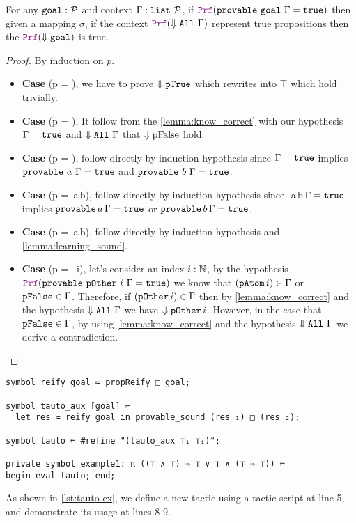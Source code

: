 \begin{theorem}
For any $\texttt{\upshape{goal}}: \mathcal{P}$ and context $\Gamma: \texttt{list}~\mathcal{P}$, if $\prf (\kw{provable}~\kw{goal}~\hyps = \true)$
then given a mapping $\sigma$, if the context $\prf (\deno{\kw{All}~\hyps})$ represent true propositions then the $\prf (\deno{\kw{goal}})$ is true.
\begin{proof} By induction on $p$.
\begin{itemize}
\item[] \textbf{Case} (p = ), we have to prove $\Downarrow \texttt{\upshape{pTrue}}$ which rewrites into $\top$ which hold trivially.
\item[] \textbf{Case} (p = ), It follow from the \cref{lemma:know_correct} with our hypothesis   $\Gamma = \texttt{\upshape{true}}$ and $\Downarrow \texttt{\upshape{All}}~\Gamma$ that $\Downarrow \text{pFalse}$ hold.
\item[] \textbf{Case} (p = ), follow directly by induction hypothesis since   $\Gamma = \texttt{\upshape{true}}$ implies $\texttt{\upshape{provable}}~a~\Gamma = \texttt{\upshape{true}}$ and $\texttt{\upshape{provable}}~b~\Gamma = \texttt{\upshape{true}}$.
\item[] \textbf{Case} (p = \,a\,b), follow directly by induction hypothesis since \,\,a\,b\,$\Gamma = \texttt{\upshape{true}}$ implies $\texttt{\upshape{provable}}\,a\,\Gamma = \texttt{\upshape{true}}$ or $\texttt{\upshape{provable}}\,b\,\Gamma = \texttt{\upshape{true}}$.
\item[] \textbf{Case} (p = \,a\,b), follow directly by induction hypothesis and \cref{lemma:learning_sound}.
\item[] \textbf{Case} (p = ~i), let's consider an index $i: \mathbb{N}$, by the hypothesis $\prf (\kw{provable}~\kw{pOther}~i~\hyps = \true)$  we know that $(\texttt{\upshape{pAtom}}\,i) \in \Gamma$ or $\texttt{\upshape{pFalse}} \in \Gamma$. Therefore,
if $(\texttt{\upshape{pOther}}\,i) \in \Gamma$ then by \cref{lemma:know_correct} and the hypothesis $\Downarrow \texttt{\upshape{All}}~\Gamma$ we have $\Downarrow \texttt{\upshape{pOther}}\,i$. However,
in the case that $\texttt{\upshape{pFalse}} \in \Gamma$, by using \cref{lemma:know_correct} and the hypothesis $\Downarrow \texttt{\upshape{All}}~\Gamma$ we derive a contradiction.
\end{itemize}
\end{proof}
\end{theorem}

\begin{lstlisting}[language=Lambdapi, caption={Usage of Tauto}, label={lst:tauto-ex}]
symbol reify goal ≔ propReify □ goal;

symbol tauto_aux [goal] ≔
  let res ≔ reify goal in provable_sound (res ₁) □ (res ₂);

symbol tauto ≔ #refine "(tauto_aux ⊤ᵢ ⊤ᵢ)";

private symbol example1: π ((⊤ ∧ ⊤) ⇒ ⊤ ∨ ⊤ ∧ (⊤ ⇒ ⊤)) ≔
begin eval tauto; end;
\end{lstlisting}

As shown in \cref{lst:tauto-ex}, we define a new tactic  using a tactic script at line 5, and demonstrate its usage at lines 8-9.

